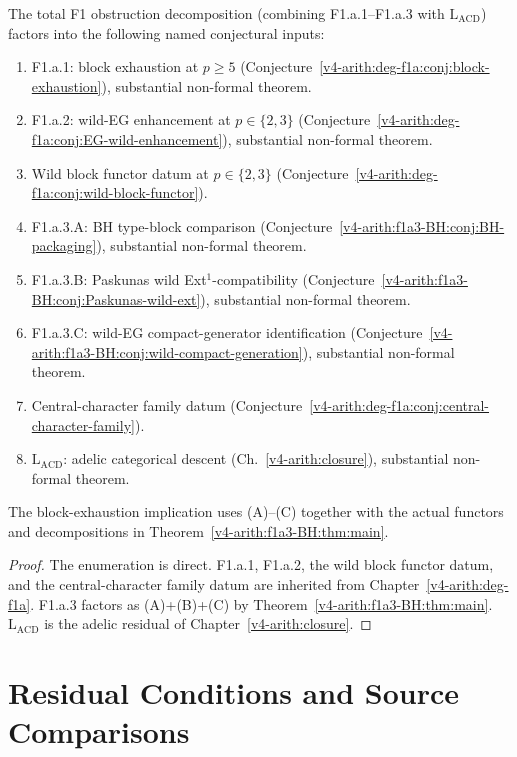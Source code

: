 \begin{proposition}
\label{v4-arith:f1a3-BH:prop:F1-table-updated}
The total F1 obstruction decomposition (combining
F1.a.1--F1.a.3 with \(\mathrm{L}_{\mathrm{ACD}}\)) factors into the
following named conjectural inputs:
\begin{enumerate}
\item F1.a.1: block exhaustion at \(p\geq 5\)
(Conjecture~\ref{v4-arith:deg-f1a:conj:block-exhaustion}), substantial
non-formal theorem.
\item F1.a.2: wild-EG enhancement at \(p\in\{2,3\}\)
(Conjecture~\ref{v4-arith:deg-f1a:conj:EG-wild-enhancement}), substantial
non-formal theorem.
\item Wild block functor datum at \(p\in\{2,3\}\)
(Conjecture~\ref{v4-arith:deg-f1a:conj:wild-block-functor}).
\item F1.a.3.A: BH type-block comparison
(Conjecture~\ref{v4-arith:f1a3-BH:conj:BH-packaging}), substantial non-formal theorem.
\item F1.a.3.B: Paskunas wild Ext\({}^{1}\)-compatibility
(Conjecture~\ref{v4-arith:f1a3-BH:conj:Paskunas-wild-ext}), substantial
non-formal theorem.
\item F1.a.3.C: wild-EG compact-generator identification
(Conjecture~\ref{v4-arith:f1a3-BH:conj:wild-compact-generation}), substantial
non-formal theorem.
\item Central-character family datum
(Conjecture~\ref{v4-arith:deg-f1a:conj:central-character-family}).
\item \(\mathrm{L}_{\mathrm{ACD}}\): adelic categorical descent
(Ch.~\ref{v4-arith:closure}), substantial non-formal theorem.
\end{enumerate}
The block-exhaustion implication uses (A)--(C) together with the
actual functors and decompositions in Theorem~\ref{v4-arith:f1a3-BH:thm:main}.
\end{proposition}

\begin{proof}
The enumeration is direct. F1.a.1, F1.a.2, the wild block functor
datum, and the central-character family datum are inherited from
Chapter~\ref{v4-arith:deg-f1a}. F1.a.3 factors as (A)+(B)+(C) by
Theorem~\ref{v4-arith:f1a3-BH:thm:main}. \(\mathrm{L}_{\mathrm{ACD}}\) is the
adelic residual of Chapter~\ref{v4-arith:closure}.
\end{proof}

\section{Residual Conditions and Source Comparisons}
\label{v4-arith:f1a3-BH:residuals-traces}

